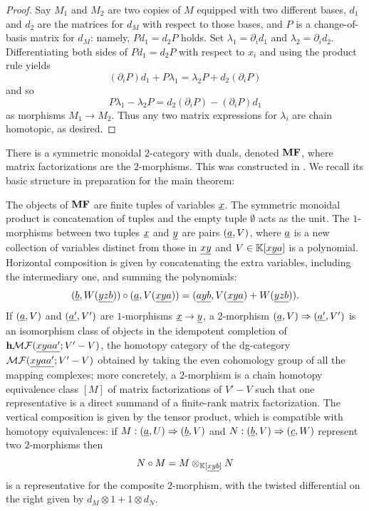 \begin{proof}
	Say $M_1$ and $M_2$ are two copies of $M$ equipped with two different bases, $d_1$ and $d_2$ are the matrices for $d_M$ with respect to those bases, and $P$ is a change-of-basis matrix for $d_M$: namely, $P d_1 = d_2 P$ holds. Set $\lambda_1 = \partial_{i} d_1$ and $\lambda_2 = \partial_{i} d_2$. Differentiating both sides of $P d_1 = d_2 P$ with respect to $x_i$ and using the product rule yields
	\begin{equation*}
		(\partial_{i} P) d_1 + P \lambda_1 = \lambda_2 P + d_2 (\partial_{i} P)
	\end{equation*}
	and so
	\begin{equation*}
		P \lambda_1 - \lambda_2 P = d_2 (\partial_{i} P) - (\partial_{i} P) d_1
	\end{equation*}
	as morphisms $M_1 \to M_2$. Thus any two matrix expressions for $\lambda_{i}$ are chain homotopic, as desired. 
\end{proof}

There is a symmetric monoidal $2$-category with duals, denoted $\mathbf{MF}$, where matrix factorizations are the $2$-morphisms. This was constructed in \cite{BCR2023}. We recall its basic structure in preparation for the main theorem:

The objects of $\mathbf{MF}$ are finite tuples of variables $\underline{x}$. The symmetric monoidal product is concatenation of tuples and the empty tuple $\emptyset$ acts as the unit. The $1$-morphisms between two tuples $\underline{x}$ and $\underline{y}$ are pairs $(\underline{a}, V)$, where $\underline{a}$ is a new collection of variables distinct from those in $\underline{xy}$ and $V \in \mathbb{K}[\underline{xya}]$ is a polynomial. Horizontal composition is given by concatenating the extra variables, including the intermediary one, and summing the polynomials:
\begin{equation*}
	(\underline{b}, W(\underline{yzb})) \circ (\underline{a}, V(\underline{xya})) = (\underline{ayb}, V(\underline{xya}) + W(\underline{yzb})). 
\end{equation*}
If $(\underline{a}, V)$ and $(\underline{a'}, V')$ are $1$-morphisms $\underline{x} \to \underline{y}$, a $2$-morphism $(\underline{a}, V) \Rightarrow (\underline{a'}, V')$ is an isomorphism class of objects in the idempotent completion of $\mathbf{h} \mathcal{MF}(\underline{xyaa'}; V' - V)$, the homotopy category of the dg-category $\mathcal{MF}(\underline{xyaa'}; V' - V)$ obtained by taking the even cohomology group of all the mapping complexes; more concretely, a $2$-morphism is a chain homotopy equivalence class $[M]$ of matrix factorizations of $V' - V$ such that one representative is a direct summand of a finite-rank matrix factorization. The vertical composition is given by the tensor product, which is compatible with homotopy equivalences: if $M : (\underline{a}, U) \Rightarrow (\underline{b}, V)$ and $N : (\underline{b}, V) \Rightarrow (\underline{c}, W)$ represent two $2$-morphisms then
\begin{equation*}
	N \circ M = M \otimes_{\mathbb{K}[\underline{xyb}]} N
\end{equation*}
is a representative for the composite $2$-morphism, with the twisted differential on the right given by $d_M \otimes 1 + 1 \otimes d_N$.

